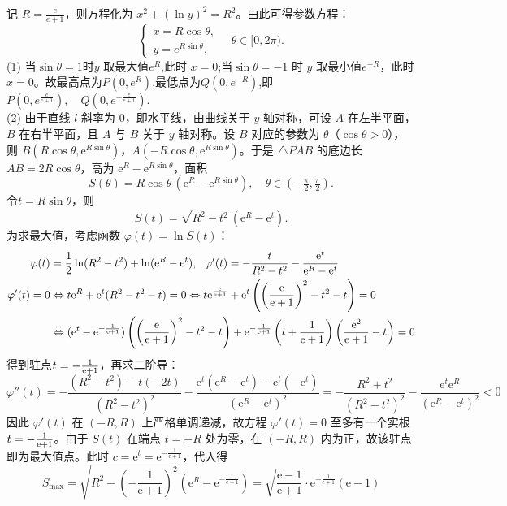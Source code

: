 \begin{solution}
记 $R = \frac{e}{e+1}$，则方程化为 $x^{2} + (\ln y)^{2} = R^{2}$。由此可得参数方程：
$$\begin{cases}
x = R \cos \theta, \\
y = e^{R \sin \theta},
\end{cases}
\quad \theta \in [0, 2\pi).$$
(1) 当$\sin\theta=1$时$y$ 取最大值$e^R$,此时 $x=0$;当$\sin\theta=-1$ 时 $y$ 取最小值$e^{-R}$，此时$x=0$。故最高点为$P(0,e^R)$,最低点为$Q(0,e^{-R})$,即
$P\left(0,e^{{\frac{e}{e+1}}}\right),\quad Q\left(0,e^{{-\frac{e}{e+1}}}\right).$\\
(2) 由于直线 $l$ 斜率为 $0$，即水平线，由曲线关于 $y$ 轴对称，可设 $A$ 在左半平面，$B$ 在右半平面，且 $A$ 与 $B$ 关于 $y$ 轴对称。设 $B$ 对应的参数为 $\theta$（$\cos\theta > 0$），则 $B(R\cos\theta, \mathrm{e}^{R\sin\theta})$，$A(-R\cos\theta, \mathrm{e}^{R\sin\theta})$。于是 $\triangle PAB$ 的底边长 $AB = 2R\cos\theta$，高为 $\mathrm{e}^{R} - \mathrm{e}^{R\sin\theta}$，面积
\[
S(\theta) = R\cos\theta\,(\mathrm{e}^{R} - \mathrm{e}^{R\sin\theta}),\quad \theta\in(-\tfrac{\pi}{2},\tfrac{\pi}{2}).
\]
令$t=R\sin\theta$，则
\[
S(t) = \sqrt{R^2-t^{2}}\,(\mathrm{e}^{R} - \mathrm{e}^{t}).
\]
为求最大值，考虑函数 $\varphi(t) = \ln S(t)$：
\begin{align*}
\varphi(t) &= \frac{1}{2}\ln(R^2 - t^2) + \ln(\mathrm{e}^{R} - \mathrm{e}^{t}),~~\varphi'(t) = -\frac{t}{R^2 - t^2} - \frac{\mathrm{e}^{t}}{\mathrm{e}^{R} - \mathrm{e}^{t}}\\
\varphi'(t)=0&\Leftrightarrow t\mathrm{e}^R + \mathrm{e}^t(R^2 - t^2 - t) = 0\Leftrightarrow t\mathrm{e}^{\frac{\mathrm{e}}{\mathrm{e}+1}} + \mathrm{e}^t\left(\left(\frac{\mathrm{e}}{\mathrm{e}+1}\right)^2 - t^2 - t\right) = 0\\
&\Leftrightarrow (\mathrm{e}^t-\mathrm{e}^{-\frac1{\mathrm{e}+1}})\left(\left(\frac{\mathrm{e}}{\mathrm{e}+1}\right)^2 - t^2 - t\right)+\mathrm{e}^{-\frac1{\mathrm{e}+1}}\left(t+\frac1{\mathrm{e}+1}\right)\left(\frac{\mathrm{e}^2}{\mathrm{e}+1}-t\right)=0
\end{align*}
得到驻点$t=-\frac{1}{\mathrm{e}+1}$，再求二阶导：
\[
\varphi''(t) = -\frac{(R^2 - t^2) - t(-2t)}{(R^2 - t^2)^2} - \frac{\mathrm{e}^{t}(\mathrm{e}^{R} - \mathrm{e}^{t}) - \mathrm{e}^{t}(-\mathrm{e}^{t})}{(\mathrm{e}^{R} - \mathrm{e}^{t})^2} = -\frac{R^2 + t^2}{(R^2 - t^2)^2} - \frac{\mathrm{e}^{t}\mathrm{e}^{R}}{(\mathrm{e}^{R} - \mathrm{e}^{t})^2} < 0
\]
因此 $\varphi'(t)$ 在 $(-R, R)$ 上严格单调递减，故方程 $\varphi'(t) = 0$ 至多有一个实根$t=-\frac{1}{\mathrm{e}+1}$。由于 $S(t)$ 在端点 $t = \pm R$ 处为零，在 $(-R, R)$ 内为正，故该驻点即为最大值点。此时 $c = \mathrm{e}^{t} = \mathrm{e}^{-\frac{1}{\mathrm{e}+1}}$，代入得
\[
S_{\max} = \sqrt{R^2 - \left(-\frac{1}{\mathrm{e}+1}\right)^2}\left(\mathrm{e}^{R} - \mathrm{e}^{-\frac{1}{\mathrm{e}+1}}\right) = \sqrt{\frac{\mathrm{e}-1}{\mathrm{e}+1}} \cdot \mathrm{e}^{-\frac{1}{\mathrm{e}+1}}(\mathrm{e}-1) 
\]
\end{solution}
